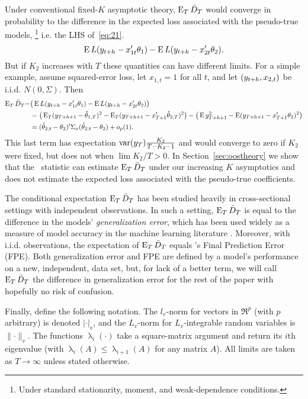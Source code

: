 \documentclass[11pt]{article}
\DeclareMathOperator{\eigen}{\lambda}
\newcommand{\citepos}[1]{\citeauthor{#1}'s \citeyearpar{#1}}
\begin{document}
Under conventional fixed-$K$ asymptotic theory, $\operatorname{E}_T \bar{D}_{T}$ would
converge in probability to the difference in the expected loss
associated with the pseudo-true models,%
\footnote{Under standard stationarity, moment, and weak-dependence
  conditions.} %
i.e. the LHS of~\eqref{eq:21}.
\begin{equation}\label{eq:22}
  \operatorname{E} L(y_{t+h} - x_{1t}'\theta_{1}) - \operatorname{E} L(y_{t+h} - x_{2t}'\theta_{2}).
\end{equation}
But if $K_2$ increases with $T$ these quantities can have different
limits. For a simple example, assume squared-error loss, let $x_{1,t}
= 1$ for all $t$, and let $(y_{t+h},x_{2,t})$ be i.i.d. $N(0,
\Sigma)$.  Then
\begin{align*}
  \operatorname{E}_T \bar{D}_{T} - & \big(\operatorname{E} L(y_{t+h} - x_{1t}'\theta_{1}) - \operatorname{E} L(y_{t+h} - x_{2t}'\theta_{2})\big) \\
  &= \big(\operatorname{E}_T (y_{T+h+1} - \hat\theta_{1,T})^2 - \operatorname{E}_T (y_{T+h+1} - x_{T+1}'\hat\theta_{2,T})^2\big) -
  \big(\operatorname{E} y_{T+h+1}^2 - \operatorname{E} (y_{T+h+1} - x_{T+1}'\theta_2)^2 \big)\\
  &= (\hat\theta_{2,t} - \theta_2)' \Sigma_x (\hat\theta_{2,t} - \theta_2) + o_p(1).
\end{align*}
This last term has expectation $\operatorname{var}(y_T) \frac{K_2}{T - K_2 - 1}$ and
would converge to zero if $K_2$ were fixed, but does not when $\lim
K_2 / T > 0$. In Section~\ref{sec:oostheory} we show that the \oost\
statistic can estimate $\operatorname{E}_T \bar{D}_{T}$ under our increasing $K$
asymptotics and does not estimate the expected loss associated with
the pseudo-true coefficients.

The conditional expectation $\operatorname{E}_T \bar{D}_{T}$ has been studied heavily in
cross-sectional settings with independent observations. In such a
setting, $\operatorname{E}_T \bar{D}_{T}$ is equal to the difference in the models'
\emph{generalization error}, which has been used widely as a measure
of model accuracy in the machine
learning literature \citep[see][for further discussion]{HTF:08}.
Moreover, with i.i.d. observations, the expectation of $\operatorname{E}_T \bar{D}_{T}$
equals \citepos{Aka:69} Final Prediction Error (FPE). Both
generalization error and FPE are defined by a model's
performance on a new, independent, data set, but, for lack of a better
term, we will call $\operatorname{E}_T \bar{D}_{T}$ the difference in generalization error
for the rest of the paper with hopefully no risk of confusion.

Finally, define the following notation.  The $l_v$-norm for vectors in
$\Re^p$ (with $p$ arbitrary) is denoted $\lvert \cdot \rvert_v$, and
the $L_v$-norm for $L_v$-integrable random variables is $\lVert \cdot
\rVert_v$.  The functions $\eigen_i(\cdot)$ take a square-matrix
argument and return its $i$th eigenvalue (with $\eigen_{i}(A) \leq
\eigen_{i+1}(A)$ for any matrix $A$).  All limits are taken as $T \to
\infty$ unless stated otherwise.
\end{document}
